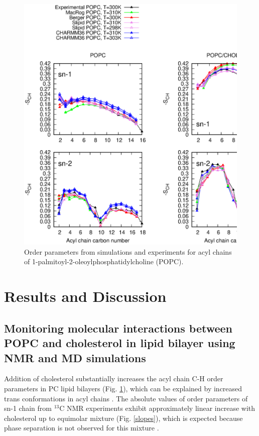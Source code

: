\documentclass[aps,prl,superscriptaddress,twocolumn]{revtex4}
\begin{document}
\begin{figure}[]
  \centering
  \includegraphics[width=17.2cm]{../FIGS/OrderParametersCHOL.eps}
  \caption{\label{OrderParametersCHOL}
    Order parameters from simulations and experiments for acyl chains of  1-palmitoyl-2-oleoylphosphatidylcholine (POPC).
  }
\end{figure}

\section{Results and Discussion}


\subsection{Monitoring molecular interactions between POPC and cholesterol in lipid bilayer using NMR and MD simulations}

Addition of cholesterol substantially increases the acyl chain C-H order parameters in PC lipid bilayers (Fig. \ref{OrderParametersCHOL}),
which can be explained by increased trans conformations in acyl chains \cite{ferreira13,??}.
The absolute values of order parameters of sn-1 chain from $^{13}$C NMR experiments \cite{ferreira13}
exhibit approximately linear increase with cholesterol up to equimolar mixture (Fig. \ref{slopes}), which is expected because
phase separation is not observed for this mixture \cite{ionova12,ferreira13}.
\end{document}
